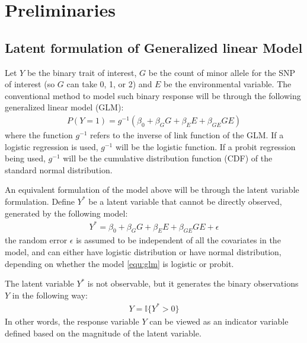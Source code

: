 

\section{Preliminaries}\label{sec:prelim}

\subsection{Latent formulation of Generalized linear Model}\label{subsec:latent}

Let $Y$ be the binary trait of interest, $G$ be the count of minor allele for the SNP of interest (so $G$ can take 0, 1, or 2) and $E$ be the environmental variable. The conventional method to model such binary response will be through the following generalized linear model (GLM):
\begin{equation}\label{equ:glm}
\begin{aligned}
P(Y = 1) = g^{-1}(\beta_0+\beta_GG + \beta_EE + \beta_{GE}GE)
\end{aligned}
\end{equation}
where the function $g^{-1}$ refers to the inverse of link function of the GLM. If a logistic regression is used, $g^{-1}$ will be the logistic function. If a probit regression being used, $g^{-1}$ will be the cumulative distribution function (CDF) of the standard normal distribution.


An equivalent formulation of the model above will be through the latent variable formulation. Define $Y^*$ be a latent variable that cannot be directly observed, generated by the following model:
\begin{equation}\label{equ:latentgenerating1}
\begin{aligned}
Y^* = \beta_0+\beta_GG + \beta_EE + \beta_{GE}GE + \epsilon
\end{aligned}
\end{equation}
the random error $\epsilon$ is assumed to be independent of all the covariates in the model, and can either have logistic distribution or have normal distribution, depending on whether the model \ref{equ:glm} is logistic or probit.


The latent variable $Y^*$ is not observable, but it generates the binary observations $Y$ in the following way:
\begin{equation}\label{equ:latentgenerating2}
\begin{aligned}
Y = \mathbb{I}\{Y^* > 0\}
\end{aligned}
\end{equation}
In other words, the response variable $Y$ can be viewed as an indicator variable defined based on the magnitude of the latent variable.


